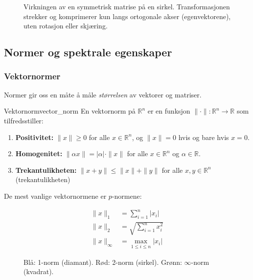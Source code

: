 \documentclass[../main.tex]{subfiles}
\begin{document}
\begin{figure}
	\centering
	
	\caption{Virkningen av en symmetrisk matrise på en sirkel. Transformasjonen strekker og komprimerer kun langs ortogonale akser (egenvektorene), uten rotasjon eller skjæring.}
	\label{fig:symmetric_action}
\end{figure}

\subsection{Normer og spektrale egenskaper}

\subsubsection{Vektornormer}
Normer gir oss en måte å måle \emph{størrelsen} av vektorer og matriser.

\begin{definition}{Vektornorm}{vector_norm}
	En vektornorm på $\mathbb{R}^n$ er en funksjon $\|\cdot\| : \mathbb{R}^n \to \mathbb{R}$ som tilfredsstiller:
	\begin{enumerate}
		\item \textbf{Positivitet:} $\|x\| \geq 0$ for alle $x \in \mathbb{R}^n$, og $\|x\| = 0$ hvis og bare hvis $x = 0$.
		\item \textbf{Homogenitet:} $\|\alpha x\| = |\alpha| \cdot \|x\|$ for alle $x \in \mathbb{R}^n$ og $\alpha \in \mathbb{R}$.
		\item \textbf{Trekantulikheten:} $\|x + y\| \leq \|x\| + \|y\|$ for alle $x,y \in \mathbb{R}^n$ (trekantulikheten)
	\end{enumerate}
\end{definition}

De mest vanlige vektornormene er $p$-normene:

\begin{align*}
	\|x\|_1      & = \sum_{i=1}^n |x_i| \tag{taxicab}            \\
	\|x\|_2      & = \sqrt{\sum_{i=1}^n x_i^2} \tag{euklidisk}   \\
	\|x\|_\infty & = \max_{1 \leq i \leq n} |x_i| \tag{maksnorm}
\end{align*}


\begin{figure}[h]
	\centering
	
	\caption{Blå: 1-norm (diamant). Rød: 2-norm (sirkel). Grønn: $\infty$-norm (kvadrat).}
	\label{fig:vector_norms}
\end{figure}
\end{document}
